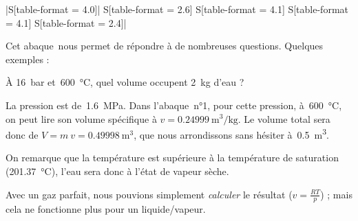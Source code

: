 \begin{table}
\begin{center}
\begin{footnotesize}
\begin{tabular}{
		|S[table-format = 4.0]|%
		S[table-format = 2.6]%
		S[table-format = 4.1]%
		S[table-format = 4.1]%
		S[table-format = 2.4]|%
		}
 		\end{tabular}\end{footnotesize}\end{center}
 		\caption{Extrait de l’abaque~n°1. Ici les mesures sont faites à~\SI{1,6}{\mega\pascal}, c’est-à-dire \SI{16}{\bar}. On observe une discontinuité entre \SI{200}{\degreeCelsius} et~\SI{300}{\degreeCelsius} : c’est le changement d’état qui a eu lieu à $T_\text{sat} = \SI{201,37}{\degreeCelsius}$.}
 		\label{tab_abaque1extrait}
 		\end{table}

		\clearfloats %
		Cet abaque~nous permet de répondre à de nombreuses questions. Quelques exemples :
			
			\begin{anexample}
			À \SI{16}{\bar} et~\SI{600}{\degreeCelsius}, quel volume occupent \SI{2}{\kilogram} d’eau ?
			
				\begin{answer}La pression est de~\SI{1,6}{\mega\pascal}. Dans l’abaque~n°1, pour cette pression, à~\SI{600}{\degreeCelsius}, on peut lire son volume spécifique à $v = \SI{0,24999}{\metre\cubed\per\kilogram}$. Le volume total sera donc de $V = m \ v = \SI{0,49998}{\metre\cubed}$, que nous arrondissons sans hésiter à~\SI{0,5}{\metre\cubed}.
					\begin{remark}On remarque que la température est supérieure à la température de saturation (\SI{201,37}{\degreeCelsius}), l’eau sera donc à l’état de vapeur sèche.\end{remark}
					\begin{remark}Avec un gaz parfait, nous pouvions simplement \emph{calculer} le résultat ($v = \frac{R T}{p}$) ; mais cela ne fonctionne plus pour un liquide/vapeur.\end{remark}\end{answer}
			\end{anexample}


